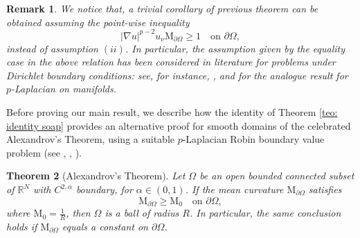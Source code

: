\documentclass[10pt,a4paper]{amsart}
\numberwithin{equation}{section}
\newcommand{\R}{\mathbb{R}}
\newtheorem{teo}{Theorem}[section]
\newtheorem{rem}[teo]{Remark}
\begin{document}
    \begin{rem}
        We notice that, a trivial corollary of previous theorem can be obtained assuming the point-wise inequality
        \[
        |\nabla u|^{p-2} u_\nu \mathrm{M}_{\partial\Omega} \geq 1 \quad \text{on } \partial\Omega, 
        \]
        instead of assumption $(ii)$. In particular, the assumption given by the equality case in the above relation has been considered in literature for problems under Dirichlet boundary conditions: see, for instance, \cite[Thm.\,2.2]{mapo19}, \cite[Thm.\,1.1]{CoFe20} and \cite[Thm.\,4]{RuHuCh24} for the analogue result for $p$-Laplacian on manifolds.
    \end{rem}

    Before proving our main result, we describe how the identity of Theorem \ref{teo: identity soap} provides an alternative proof for smooth domains of the celebrated Alexandrov's Theorem, using a suitable $p$-Laplacian Robin boundary value problem (see \cite[Thm.\,2.2]{mapo19}, \cite[Thm.\,7]{gamo26}, \cite[Thm.\,3.1]{CoFe20}).
    
    \begin{teo}[Alexandrov’s Theorem]\label{thm alexandrov}
        Let $\Omega$ be an open bounded connected subset of $\R^N$ with $C^{2,\alpha}$ boundary, for $\alpha \in (0,1)$. If the mean curvature $\mathrm{M}_{\partial\Omega}$ satisfies 
        \begin{equation}\label{eq: cond M > M0}
            \mathrm{M}_{\partial\Omega} \geq \mathrm{M}_{0} \quad \text{on } \partial\Omega, 
        \end{equation}
        where $\mathrm{M}_0 = \frac{1}{R}$, then $\Omega$ is a ball of radius $R$. In particular, the same conclusion holds if $\mathrm{M}_{\partial\Omega}$ equals a constant on $\partial \Omega$.
    \end{teo}
\end{document}
